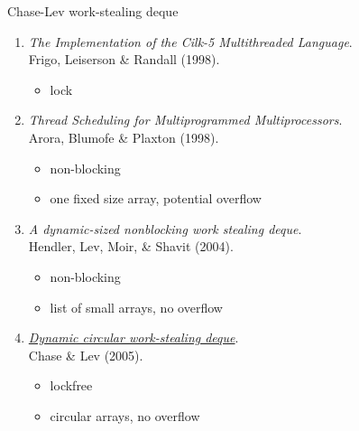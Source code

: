 \begin{frame}{Chase-Lev work-stealing deque}
\begin{enumerate}
	\item
		\textit{The Implementation of the Cilk-5 Multithreaded Language}. \\
		Frigo, Leiserson \& Randall (1998).
		\begin{itemize}
			\item lock
		\end{itemize}
	\item
		\textit{Thread Scheduling for Multiprogrammed Multiprocessors}. \\
		Arora, Blumofe \& Plaxton (1998).
		\begin{itemize}
			\item non-blocking
			\item one fixed size array, potential overflow
		\end{itemize}
	\item
		\textit{A dynamic-sized nonblocking work stealing deque}. \\
		Hendler, Lev, Moir, \& Shavit (2004).
		\begin{itemize}
			\item non-blocking
			\item list of small arrays, no overflow
		\end{itemize}
	\item
		\underline{\textit{Dynamic circular work-stealing deque}}. \\
		Chase \& Lev (2005).
		\begin{itemize}
			\item lockfree
			\item circular arrays, no overflow
		\end{itemize}
\end{enumerate}
\end{frame}